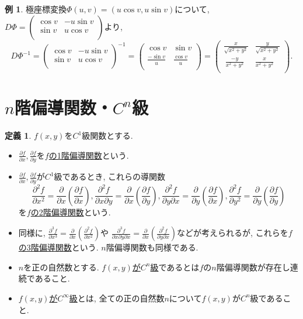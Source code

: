 \documentclass[dvipdfmx,a4paper,11pt]{article}
\theoremstyle{definition}
\newtheorem{dfn}[thm]{定義}
\newtheorem{exa}[thm]{例}
\newcommand{\pdrv}[2]{\frac{\partial #1}{\partial #2}}
\newcommand{\ppdrv}[3]{\frac{\partial^2 #1}{\partial #2 \partial #3}}
\begin{document}
\begin{exa}

     極座標変換$\Phi(u,v)  = (u \cos v, u \sin v)$について,
$D\Phi = \left(\begin{array}{cc} \cos v& -u\sin v\\ \sin v& u \cos v\\ \end{array} \right)$より, 
$$D\Phi^{-1} = \left(\begin{array}{cc} \cos v& -u\sin v\\ \sin v& u \cos v\\ \end{array} \right)^{-1}
= \left(\begin{array}{cc} \cos v& \sin v\\ \frac{-\sin v}{u}& \frac{\cos v}{u}\\ \end{array} \right)
= \left(\begin{array}{cc} \frac{x}{\sqrt{x^2+y^2}}& \frac{y}{\sqrt{x^2+y^2}}\\\ \frac{-y}{x^2+y^2}& \frac{x}{x^2+y^2}\\ \end{array} \right).
$$
    
    \end{exa}
    
\section{$n$階偏導関数・$C^n$級}

\begin{tcolorbox}[
    colback = white,
    colframe = green!35!black,
    fonttitle = \bfseries,
    breakable = true]
    \begin{dfn}
$f(x,y)$を$C^1$級関数とする.
\begin{itemize}
\item $\pdrv{f}{x} , \pdrv{f}{y}$を\underline{$f$の1階偏導関数}という.
\item $\pdrv{f}{x} , \pdrv{f}{y}$が$C^1$級であるとき, これらの導関数
$$
\pdrv{^2f}{x^2} = \pdrv{}{x}\left( \pdrv{f}{x} \right), 
\ppdrv{f}{x}{y} =\pdrv{}{x}\left( \pdrv{f}{y} \right), 
\ppdrv{f}{y}{x} =\pdrv{}{y}\left( \pdrv{f}{x} \right), 
\pdrv{^2f}{y^2} = \pdrv{}{y}\left( \pdrv{f}{y} \right)
$$
を\underline{$f$の2階偏導関数}という.
\item 同様に, $\pdrv{^3f}{x^3} = \pdrv{}{x}\left( \pdrv{^2f}{x^2} \right)$や
$\frac{\partial^3 f}{\partial x \partial y \partial x} = \pdrv{}{x}\left( \ppdrv{f}{y}{x}\right)$などが考えられるが, これらを\underline{$f$の3階偏導関数}という.
$n$階偏導関数も同様である.

\item $n$を正の自然数とする.
\underline{$f(x,y)$が$C^n$級}であるとは$f$の$n$階偏導関数が存在し連続であること.
\item \underline{$f(x,y)$が$C^{\infty}$級}とは, 全ての正の自然数$n$について$f(x,y)$が$C^n$級であること.

\end{itemize}

    \end{dfn}
    \end{tcolorbox}
\end{document}
